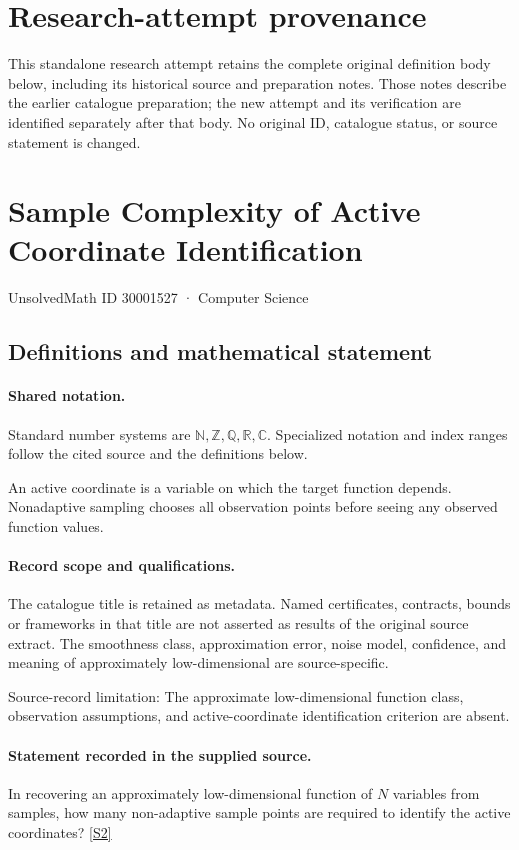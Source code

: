 \documentclass[11pt]{article}
\begin{document}
\section*{Research-attempt provenance}
This standalone research attempt retains the complete original definition body below,
including its historical source and preparation notes. Those notes describe the
earlier catalogue preparation; the new attempt and its verification are identified
separately after that body. No original ID, catalogue status, or source statement is changed.

\section{Sample Complexity of Active Coordinate Identification}\label{30001527}
{\small UnsolvedMath ID 30001527 · Computer Science}
\subsection{Definitions and mathematical statement}

\paragraph{Shared notation.}Standard number systems are $\mathbb N,\mathbb Z,\mathbb Q,\mathbb R,\mathbb C$. Specialized notation and index ranges follow the cited source and the definitions below.


An active coordinate is a variable on which the target function depends. Nonadaptive sampling chooses all observation points before seeing any observed function values.
\paragraph{Record scope and qualifications.}
The catalogue title is retained as metadata. Named certificates, contracts, bounds or frameworks in that title are not asserted as results of the original source extract.
The smoothness class, approximation error, noise model, confidence, and meaning of approximately low-dimensional are source-specific.

Source-record limitation: The approximate low-dimensional function class, observation assumptions, and active-coordinate identification criterion are absent.
\paragraph{Statement recorded in the supplied source.}
In recovering an approximately low-dimensional function of $N$ variables from samples, how many non-adaptive sample points are required to identify the active coordinates? \href{https://doi.org/10.4171/owr/2010/33}{[S2]}
\end{document}
